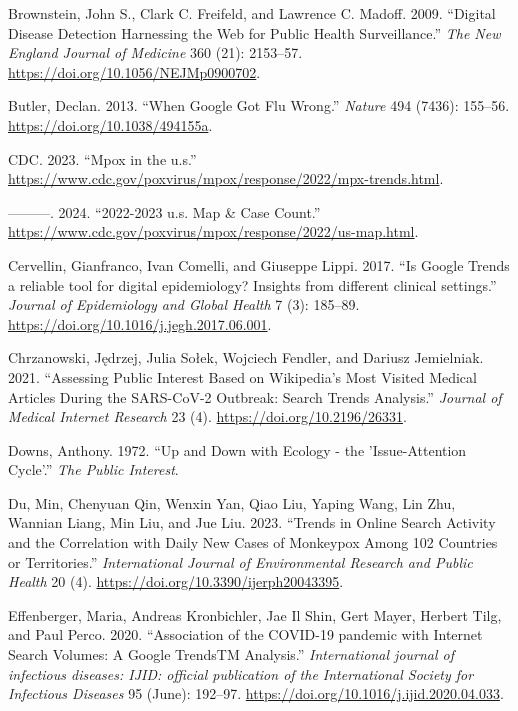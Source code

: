 \documentclass[
  12pt,
]{article}
\newlength{\cslhangindent}
\newenvironment{CSLReferences}[2] %
 {\begin{list}{}{%
  \setlength{\itemindent}{0pt}
  \setlength{\leftmargin}{0pt}
  \setlength{\parsep}{0pt}
  \ifodd #1
   \setlength{\leftmargin}{\cslhangindent}
   \setlength{\itemindent}{-1\cslhangindent}
  \fi
  \setlength{\itemsep}{#2\baselineskip}}}
 {\end{list}}
\begin{document}
\begin{CSLReferences}{1}{0}
Brownstein, John S., Clark C. Freifeld, and Lawrence C. Madoff. 2009.
{``Digital Disease Detection {\textemdash} Harnessing the Web for Public
Health Surveillance.''} \emph{The New England Journal of Medicine} 360
(21): 2153--57. \url{https://doi.org/10.1056/NEJMp0900702}.

Butler, Declan. 2013. {``When Google Got Flu Wrong.''} \emph{Nature} 494
(7436): 155--56. \url{https://doi.org/10.1038/494155a}.

CDC. 2023. {``Mpox in the u.s.''}
\url{https://www.cdc.gov/poxvirus/mpox/response/2022/mpx-trends.html}.

---------. 2024. {``2022-2023 u.s. Map \& Case Count.''}
\url{https://www.cdc.gov/poxvirus/mpox/response/2022/us-map.html}.

Cervellin, Gianfranco, Ivan Comelli, and Giuseppe Lippi. 2017. {``Is
Google Trends a reliable tool for digital epidemiology? Insights from
different clinical settings.''} \emph{Journal of Epidemiology and Global
Health} 7 (3): 185--89.
\url{https://doi.org/10.1016/j.jegh.2017.06.001}.

Chrzanowski, Jędrzej, Julia Sołek, Wojciech Fendler, and Dariusz
Jemielniak. 2021. {``Assessing Public Interest Based on Wikipedia{'}s
Most Visited Medical Articles During the SARS-CoV-2 Outbreak: Search
Trends Analysis.''} \emph{Journal of Medical Internet Research} 23 (4).
\url{https://doi.org/10.2196/26331}.

Downs, Anthony. 1972. {``Up and Down with Ecology - the 'Issue-Attention
Cycle'.''} \emph{The Public Interest}.

Du, Min, Chenyuan Qin, Wenxin Yan, Qiao Liu, Yaping Wang, Lin Zhu,
Wannian Liang, Min Liu, and Jue Liu. 2023. {``Trends in Online Search
Activity and the Correlation with Daily New Cases of Monkeypox Among 102
Countries or Territories.''} \emph{International Journal of
Environmental Research and Public Health} 20 (4).
\url{https://doi.org/10.3390/ijerph20043395}.

Effenberger, Maria, Andreas Kronbichler, Jae Il Shin, Gert Mayer,
Herbert Tilg, and Paul Perco. 2020. {``Association of the COVID-19
pandemic with Internet Search Volumes: A Google TrendsTM Analysis.''}
\emph{International journal of infectious diseases: IJID: official
publication of the International Society for Infectious Diseases} 95
(June): 192--97. \url{https://doi.org/10.1016/j.ijid.2020.04.033}.


\end{CSLReferences}
\end{document}
